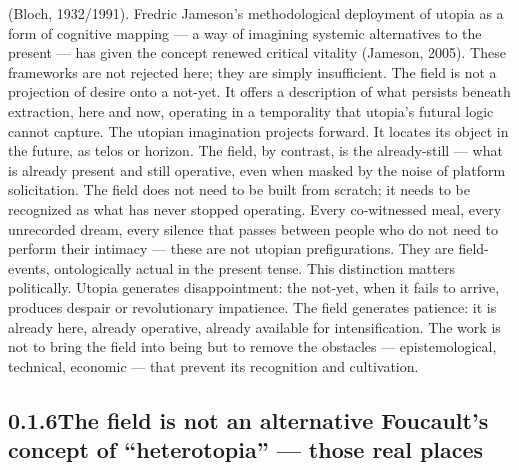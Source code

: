 (Bloch, 1932/1991). Fredric Jameson’s methodological deployment of utopia as a form of cognitive mapping — a way of imagining systemic alternatives to the present — has given the concept renewed critical vitality (Jameson, 2005). These frameworks are not rejected here; they are simply insufficient. The field is not a projection of desire onto a not-yet. It offers a description of what persists beneath extraction, here and now, operating in a temporality that utopia’s futural logic cannot capture. The utopian imagination projects forward. It locates its object in the future, as telos or horizon. The field, by contrast, is the already-still — what is already present and still operative, even when masked by the noise of platform solicitation. The field does not need to be built from scratch; it needs to be recognized as what has never stopped operating. Every co-witnessed meal, every unrecorded dream, every silence that passes between people who do not need to perform their intimacy — these are not utopian prefigurations. They are field-events, ontologically actual in the present tense. This distinction matters politically. Utopia generates disappointment: the not-yet, when it fails to arrive, produces despair or revolutionary impatience. The field generates patience: it is already here, already operative, already available for intensification. The work is not to bring the field into being but to remove the obstacles — epistemological, technical, economic — that prevent its recognition and cultivation.

\subsection{0.1.6\quad The field is not an alternative Foucault’s concept of “heterotopia” — those real places}

